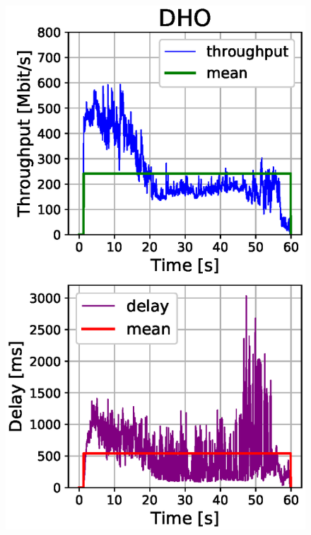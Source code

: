 \documentclass[conference,10pt]{IEEEtran}
\begin{document}
\begin{enumerate}
\begin{figure}[!t]
	\begin{center}
	\begin{minipage}{.245\textwidth}
		\centering
		\includegraphics[width=\linewidth, keepaspectratio]{images/results_dho.eps}
		\label{fig:test1}
	\end{minipage}%
	\begin{minipage}{.245\textwidth}
		\centering

\end{minipage}
\end{center}
\end{figure}
\end{enumerate}
\end{document}
